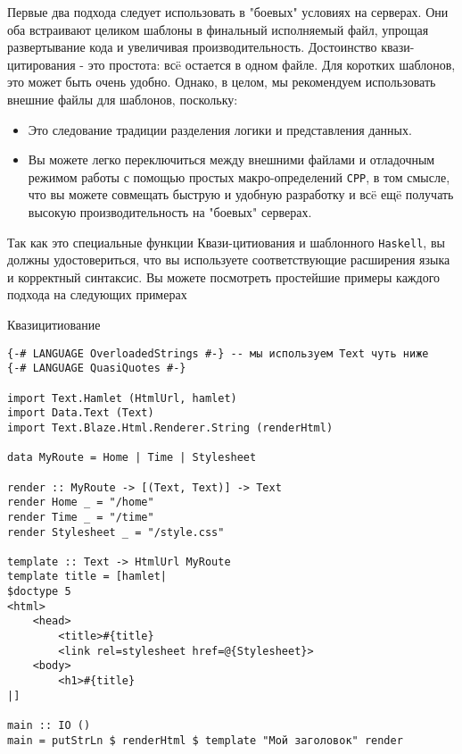 Первые два подхода следует использовать в "боевых" условиях на серверах.
Они оба встраивают целиком шаблоны в финальный исполняемый файл, упрощая 
развертывание кода и увеличивая производительность.
Достоинство квази-цитирования - это простота: всë остается в одном файле.
Для коротких шаблонов, это может быть очень удобно. Однако, в целом, мы рекомендуем
использовать внешние файлы для шаблонов, поскольку:

\begin{itemize}
\item Это следование традиции разделения логики и представления данных.
\item Вы можете легко переключиться между внешними файлами и отладочным режимом
работы с помощью простых макро-определений \texttt{CPP}, в том смысле, что вы
можете совмещать быструю и удобную разработку и всë ещë получать высокую
производительность на "боевых" серверах.
\end{itemize}

Так как это специальные функции Квази-цитиования и шаблонного \texttt{Haskell}, вы 
должны удостовериться, что вы используете соответствующие расширения языка
и корректный синтаксис. Вы можете посмотреть простейшие примеры каждого подхода
на следующих примерах

Квазицитиование
\begin{lstlisting}
{-# LANGUAGE OverloadedStrings #-} -- мы используем Text чуть ниже
{-# LANGUAGE QuasiQuotes #-}

import Text.Hamlet (HtmlUrl, hamlet)
import Data.Text (Text)
import Text.Blaze.Html.Renderer.String (renderHtml)

data MyRoute = Home | Time | Stylesheet

render :: MyRoute -> [(Text, Text)] -> Text
render Home _ = "/home"
render Time _ = "/time"
render Stylesheet _ = "/style.css"

template :: Text -> HtmlUrl MyRoute
template title = [hamlet|
$doctype 5
<html>
    <head>
        <title>#{title}
        <link rel=stylesheet href=@{Stylesheet}>
    <body>
        <h1>#{title}
|]

main :: IO ()
main = putStrLn $ renderHtml $ template "Мой заголовок" render
\end{lstlisting}

